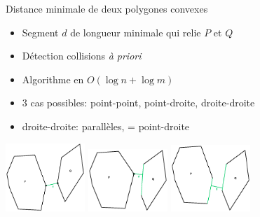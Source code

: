 \documentclass{beamer}
\begin{document}
\begin{frame}{Distance minimale de deux polygones convexes}
	\begin{itemize}
	\item Segment $d$ de longueur minimale qui relie $P$ et $Q$
	\item Détection collisions \emph{à priori}
	\item Algorithme en $O(\log n + \log m)$
	\item 3 cas possibles: point-point, point-droite, droite-droite
	\item droite-droite: parallèles, = point-droite
	\end{itemize}
	\includegraphics[width=3cm]{dpp.eps} \hspace{0.5cm}
	\includegraphics[width=3cm]{dpl.eps} \hspace{0.5cm}
	\includegraphics[width=3cm]{dll.eps}
\end{frame}
\end{document}
